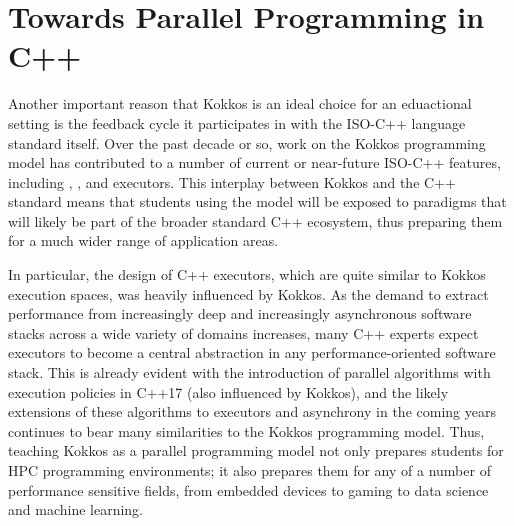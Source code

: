 
\section{Towards Parallel Programming in C++}\label{chap:c++}

Another important reason that Kokkos is an ideal choice for an eduactional setting is the feedback cycle it participates in with the ISO-C++ language standard itself.  Over the past decade or so, work on the Kokkos programming model has contributed to a number of current or near-future ISO-C++ features, including , , and executors.  This interplay between Kokkos and the C++ standard means that students using the model will be exposed to paradigms that will likely be part of the broader standard C++ ecosystem, thus preparing them for a much wider range of application areas.

In particular, the design of C++ executors, which are quite similar to Kokkos execution spaces, was heavily influenced by Kokkos.  As the demand to extract performance from increasingly deep and increasingly asynchronous software stacks across a wide variety of domains increases, many C++ experts expect executors to become a central abstraction in any performance-oriented software stack.  This is already evident with the introduction of parallel algorithms with execution policies in C++17 (also influenced by Kokkos), and the likely extensions of these algorithms to executors and asynchrony in the coming years continues to bear many similarities to the Kokkos programming model.  Thus, teaching Kokkos as a parallel programming model not only prepares students for HPC programming environments; it also prepares them for any of a number of performance sensitive fields, from embedded devices to gaming to data science and machine learning.
